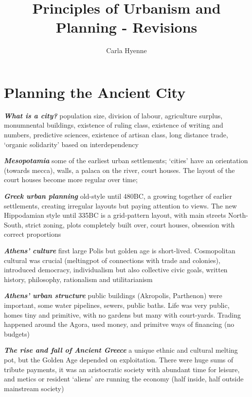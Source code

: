 \documentclass{article}
\title{Principles of Urbanism and Planning - Revisions}
\author{Carla Hyenne}
\newcommand{\bisection}[1]{\textbf{\textit{#1}}}
\newcommand{\alignedmarginpar}[1]{%
        \marginpar{\raggedright\small #1}
    }
\begin{document}
\maketitle

\tableofcontents

\pagebreak

\pagebreak
\section{Planning the Ancient City}

\bisection{What is a city?}\alignedmarginpar{Childe 10 traits} population size, division of labour, agriculture surplus, monumnental buildings, existence of ruling class, existence of writing and numbers, predictive sciences, existence of artisan class, long distance trade, `organic solidarity' based on interdependency

\bisection{Mesopotamia} some of the earliest urban settlements; `cities' have an orientation (towards mecca), walls, a palaca on the river, court houses. The layout of the court houses become more regular over time;

\bisection{Greek urban planning}\alignedmarginpar{Athens, Olympia} old-style until 480BC, a growing together of earlier settlements, creating irregular layouts but paying attention to views. The new Hippodamian style until 335BC is a grid-pattern layout, with main streets North-South, strict zoning, plots completely built over, court houses, obsession with correct proportions

\bisection{Athens' culture} first large Polis but golden age is short-lived. Cosmopolitan cultural was crucial (meltingpot of connections with trade and colonies), introduced democracy, individualism but also collective civic goals, written history, philosophy, rationalism and utilitarianism

\bisection{Athens' urban structure} public buildings (Akropolis, Parthenon) were important, some water pipelines, sewers, public baths. Life was very public, homes tiny and primitive, with no gardens but many with court-yards. Trading happened around the Agora, used money, and primitve ways of financing (no budgets)

\bisection{The rise and fall of Ancient Greece}\alignedmarginpar{P. Hall} a unique ethnic and cultural melting pot, but the Golden Age depended on exploitation. There were huge sums of tribute payments, it was an aristocratic society with abundant time for leisure, and metics or resident `aliens' are running the economy (half inside, half outside mainstream society)
\end{document}
